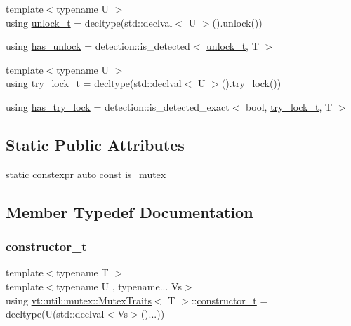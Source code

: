 \begin{DoxyCompactItemize}
\item 
{\footnotesize template$<$typename U $>$ }\\using \hyperlink{structvt_1_1util_1_1mutex_1_1_mutex_traits_a85a0412ba9bfe2c48ee8bd27096050e6}{unlock\+\_\+t} = decltype(std\+::declval$<$ U $>$().unlock())
\item 
using \hyperlink{structvt_1_1util_1_1mutex_1_1_mutex_traits_a3713680d5ba4d4c52b5648eb4490abe4}{has\+\_\+unlock} = detection\+::is\+\_\+detected$<$ \hyperlink{structvt_1_1util_1_1mutex_1_1_mutex_traits_a85a0412ba9bfe2c48ee8bd27096050e6}{unlock\+\_\+t}, T $>$
\item 
{\footnotesize template$<$typename U $>$ }\\using \hyperlink{structvt_1_1util_1_1mutex_1_1_mutex_traits_a444680f011349740337d02124ac0bdea}{try\+\_\+lock\+\_\+t} = decltype(std\+::declval$<$ U $>$().try\+\_\+lock())
\item 
using \hyperlink{structvt_1_1util_1_1mutex_1_1_mutex_traits_a07dcb11ab208e370364fb650ca014181}{has\+\_\+try\+\_\+lock} = detection\+::is\+\_\+detected\+\_\+exact$<$ bool, \hyperlink{structvt_1_1util_1_1mutex_1_1_mutex_traits_a444680f011349740337d02124ac0bdea}{try\+\_\+lock\+\_\+t}, T $>$
\end{DoxyCompactItemize}
\subsection*{Static Public Attributes}
\begin{DoxyCompactItemize}
\item 
static constexpr auto const \hyperlink{structvt_1_1util_1_1mutex_1_1_mutex_traits_ac5087e94d2ca61e0cd4049f8c82ff009}{is\+\_\+mutex}
\end{DoxyCompactItemize}


\subsection{Member Typedef Documentation}
\mbox{\label{structvt_1_1util_1_1mutex_1_1_mutex_traits_a820317fa9aa30030a917301d5cd9d58d}} 
\subsubsection{\texorpdfstring{constructor\+\_\+t}{constructor\_t}}
{\footnotesize\ttfamily template$<$typename T $>$ \\
template$<$typename U , typename... Vs$>$ \\
using \hyperlink{structvt_1_1util_1_1mutex_1_1_mutex_traits}{vt\+::util\+::mutex\+::\+Mutex\+Traits}$<$ T $>$\+::\hyperlink{structvt_1_1util_1_1mutex_1_1_mutex_traits_a820317fa9aa30030a917301d5cd9d58d}{constructor\+\_\+t} =  decltype(U(std\+::declval$<$Vs$>$()...))}

